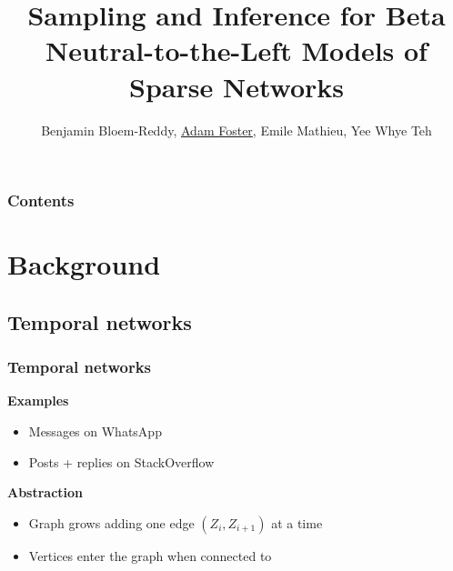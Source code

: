 \documentclass[final,hyperref={pdfpagelabels=false},noamsthm]{beamer}
\title{Sampling and Inference for Beta Neutral-to-the-Left Models of Sparse Networks} %
\author{Benjamin Bloem-Reddy, \underline{Adam Foster}, Emile Mathieu, Yee Whye Teh }
\institute{Department of Statistics, University of Oxford}
\begin{document}
	
\begin{frame}[plain]
	\titlepage
\end{frame}

\begin{frame}
	\frametitle{Contents}
	\tableofcontents
\end{frame}

\section{Background}
\subsection{Temporal networks}

\begin{frame}
	\frametitle{Temporal networks}
	\textbf{Examples}
	\begin{itemize}
		\item Messages on WhatsApp
		\item Posts + replies on StackOverflow
	\end{itemize}
	\vspace{15pt}
	\textbf{Abstraction}
	\begin{itemize}
		\item Graph grows adding one edge $(Z_i, Z_{i+1})$ at a time
		\item Vertices enter the graph when connected to
	\end{itemize}
	
\end{frame}
\end{document}
